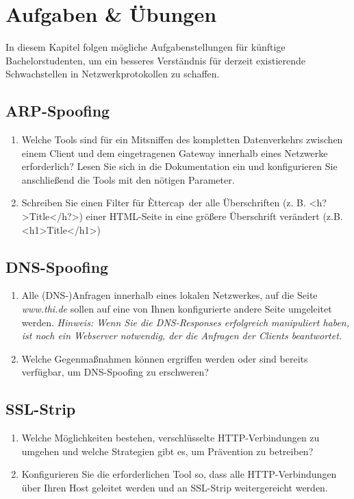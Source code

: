 \chapter{Aufgaben \& Übungen}

In diesem Kapitel folgen mögliche Aufgabenstellungen für künftige Bachelorstudenten, um ein besseres Verständnis für derzeit existierende Schwachstellen in Netzwerkprotokollen zu schaffen.

\section*{ARP-Spoofing}

\begin{enumerate}
\item Welche Tools sind für ein Mitsniffen des kompletten Datenverkehrs zwischen einem Client und dem eingetragenen Gateway innerhalb eines Netzwerke erforderlich? Lesen Sie sich in die Dokumentation ein und konfigurieren Sie anschließend die Tools mit den nötigen Parameter.
\item Schreiben Sie einen Filter für \`Ettercap\, der alle Überschriften (z. B. \textless h?\textgreater Title\textless /h?\textgreater) einer HTML-Seite in eine größere Überschrift verändert (z.B.  \textless h1\textgreater Title\textless /h1\textgreater)
\end{enumerate}

\section*{DNS-Spoofing}

\begin{enumerate}
\item Alle (DNS-)Anfragen innerhalb eines lokalen Netzwerkes, auf die Seite \textit{www.thi.de} sollen auf eine von Ihnen konfigurierte andere Seite umgeleitet werden. \textit{Hinweis: Wenn Sie die DNS-Responses erfolgreich manipuliert haben, ist noch ein Webserver notwendig, der die Anfragen der Clients beantwortet.}
\item Welche Gegenmaßnahmen können ergriffen werden oder sind bereits verfügbar, um DNS-Spoofing zu erschweren?
\end{enumerate}

\section*{SSL-Strip}

\begin{enumerate}
\item Welche Möglichkeiten bestehen, verschlüsselte HTTP-Verbindungen zu umgehen und welche Strategien gibt es, um Prävention zu betreiben?
\item Konfigurieren Sie die erforderlichen Tool so, dass alle HTTP-Verbindungen über Ihren Host geleitet werden und an SSL-Strip weitergereicht werden.
\end{enumerate}


